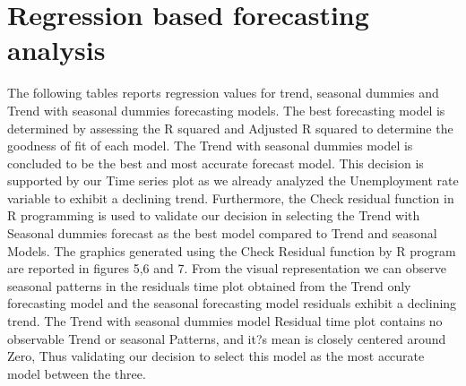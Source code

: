 \documentclass[12pt]{article}
\begin{document}
\section{Regression based forecasting analysis}
The following tables reports regression values for trend, seasonal dummies  and Trend with seasonal dummies forecasting models. The best forecasting model is determined by assessing the R squared and Adjusted R squared to determine the goodness of fit of each model. The Trend with seasonal dummies model is concluded to be the best and most accurate forecast model. This decision is supported by our Time series plot as we already analyzed the Unemployment rate variable to exhibit a declining trend.  Furthermore, the Check residual function in R programming is used to validate our decision in selecting the Trend with Seasonal dummies forecast as the best model compared to Trend and seasonal Models. The graphics generated using the Check Residual  function by R program are reported in figures 5,6 and 7.  From the visual representation we can observe seasonal patterns in the residuals time plot obtained from the Trend only forecasting model and the seasonal forecasting model residuals exhibit a declining trend. The Trend with seasonal dummies model Residual time plot contains no observable Trend or seasonal Patterns, and it?s mean is closely centered around Zero, Thus validating our decision to select this model as the most accurate model between the three.
\end{document}

